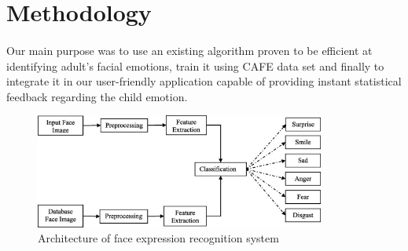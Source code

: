 \documentclass[runningheads,a4paper,11pt]{report}
\begin{document}
\newpage

\section{Methodology}
\label{section:methodology}

\paragraph{}
Our main purpose was to use an existing algorithm proven to be efficient at identifying adult's facial emotions, train it using CAFE \cite{LoBlue2015} data set and finally to integrate it in our user-friendly application capable of providing instant statistical feedback regarding the child emotion.

\begin{figure}[!ht]
  \label{fig::architecture}
  \centering
  \includegraphics[width=0.85\textwidth]{Images/arhitecture.jpg}
  \caption{Architecture of face expression recognition system \cite{Revina2018}}
\end{figure}
\end{document}

